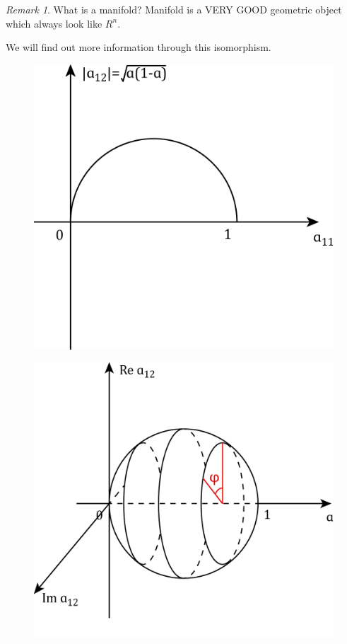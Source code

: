 \documentclass[11pt]{amsart}
\numberwithin{equation}{section}
\theoremstyle{plain}
\theoremstyle{plain}
\numberwithin{equation}{section}
\theoremstyle{remark}
\newtheorem{remark}[theorem]{Remark}
\begin{document}
\begin{remark}
What is a manifold? Manifold is a VERY GOOD geometric object which always look like $R^n$.
\end{remark}
We will find out more information through this isomorphism.	
		  	\begin{figure}[ht]
	\begin{minipage}[t]{.49\textwidth}
		\centering
		\includegraphics[width=.91\textwidth]{figures/figure5.png}\\
		\caption{}
		\label{fig5}
	\end{minipage}
	\begin{minipage}[t]{.49\textwidth}
		\centering
		\includegraphics[width=.95\textwidth]{figures/figure6.png}\\
		\caption{}
		\label{fig6}
	\end{minipage}
\end{figure}
\end{document}
